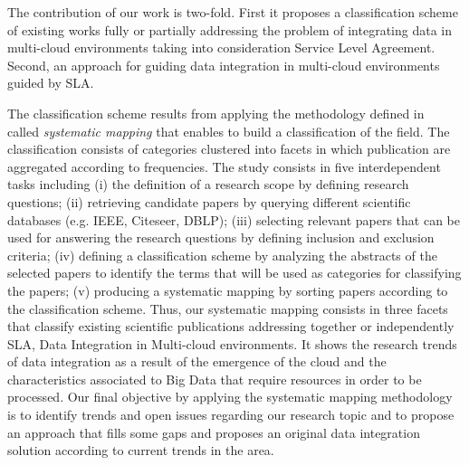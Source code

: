 The contribution of our work is two-fold. First it proposes a classification scheme of existing works fully or partially addressing the problem of integrating data in multi-cloud environments taking into consideration Service Level Agreement. Second, an approach for guiding data integration in multi-cloud environments guided by SLA. 

The classification scheme results from  applying the  methodology defined in~\cite{SM:Petersen:2008} called  \textit{systematic mapping}  that enables to build a classification of the field. The classification consists of categories clustered into facets in which publication are aggregated according to frequencies. The study consists in  five interdependent tasks including (i) the definition of a research scope by defining research questions; (ii) retrieving candidate papers by querying different scientific databases (e.g. IEEE, Citeseer, DBLP); (iii) selecting relevant papers that can be used for answering the research questions by defining inclusion and exclusion criteria; (iv) defining a classification scheme by analyzing the abstracts of the selected papers to identify the terms that will be used as categories for classifying the papers; (v) producing a systematic mapping by sorting papers according to the classification scheme. Thus, our systematic mapping consists in three facets that classify existing scientific publications addressing  together or independently SLA, Data Integration in Multi-cloud environments. It shows the research trends of data integration as a result of the emergence of the cloud and the characteristics associated to Big Data that require resources in order to be processed. Our final objective by applying the systematic mapping methodology is to identify trends and open issues regarding our research topic and to propose an approach that fills some gaps and proposes an original data integration solution according to current trends in the area. 




